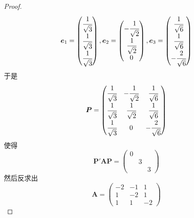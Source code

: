 {\begin{proof}
        \begin{align*}
            \bm{e}_1=\begin{pmatrix}
                         \cfrac{1}{\sqrt{3}} \\\cfrac{1}{\sqrt{3}}\\\cfrac{1}{\sqrt{3}}
                     \end{pmatrix},\bm{e}_2=\begin{pmatrix}
                                                -\cfrac{1}{\sqrt{2}} \\\cfrac{1}{\sqrt{2}}\\0
                                            \end{pmatrix},\bm{e}_3=\begin{pmatrix}
                                                                       \cfrac{1}{\sqrt{6}} \\\cfrac{1}{\sqrt{6}}\\-\cfrac{2}{\sqrt{6}}
                                                                   \end{pmatrix}
        \end{align*}于是\[
            \bm{P}=\begin{pmatrix}
                \cfrac{1}{\sqrt{3}} & -\cfrac{1}{\sqrt{2}} & \cfrac{1}{\sqrt{6}}  \\
                \cfrac{1}{\sqrt{3}} & \cfrac{1}{\sqrt{2}}  & \cfrac{1}{\sqrt{6}}  \\
                \cfrac{1}{\sqrt{3}} & 0                    & -\cfrac{2}{\sqrt{6}}
            \end{pmatrix}
        \]使得\[
            \bm{P}'\bm{AP}=\begin{pmatrix}
                0 &   &   \\
                  & 3 &   \\
                  &   & 3
            \end{pmatrix}
        \]然后反求出\[
            \bm{A}=\begin{pmatrix}
                -2 & -1 & 1  \\
                1  & -2 & 1  \\
                1  & 1  & -2
            \end{pmatrix}
        \]
    \end{proof}
}
